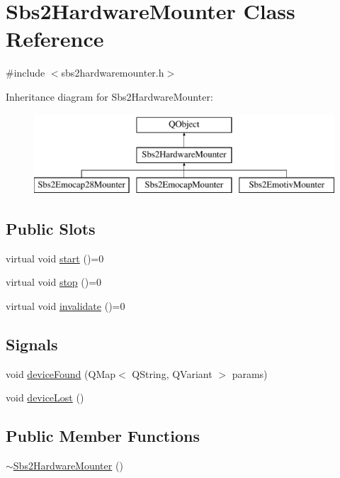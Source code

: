 \hypertarget{classSbs2HardwareMounter}{\section{Sbs2\-Hardware\-Mounter Class Reference}
\label{classSbs2HardwareMounter}
}


{\ttfamily \#include $<$sbs2hardwaremounter.\-h$>$}

Inheritance diagram for Sbs2\-Hardware\-Mounter\-:\begin{figure}[H]
\begin{center}
\leavevmode
\includegraphics[height=3.000000cm]{classSbs2HardwareMounter}
\end{center}
\end{figure}
\subsection*{Public Slots}
\begin{DoxyCompactItemize}
\item 
virtual void \hyperlink{classSbs2HardwareMounter_a5a37fde350e3db7bf70d7be368b876e9}{start} ()=0
\item 
virtual void \hyperlink{classSbs2HardwareMounter_a27bc12c9e5a1eeeed3669bc6afd780dd}{stop} ()=0
\item 
virtual void \hyperlink{classSbs2HardwareMounter_ae890d839cf616daf0ea80cc2e44ce2bd}{invalidate} ()=0
\end{DoxyCompactItemize}
\subsection*{Signals}
\begin{DoxyCompactItemize}
\item 
void \hyperlink{classSbs2HardwareMounter_a42bb432337e0cffc85baadf83a1813cd}{device\-Found} (Q\-Map$<$ Q\-String, Q\-Variant $>$ params)
\item 
void \hyperlink{classSbs2HardwareMounter_a715feed025039fbf3aaba0cb0621b453}{device\-Lost} ()
\end{DoxyCompactItemize}
\subsection*{Public Member Functions}
\begin{DoxyCompactItemize}
\item 
\hyperlink{classSbs2HardwareMounter_a791fa95ec691263fc0fdf1bddd21e92a}{$\sim$\-Sbs2\-Hardware\-Mounter} ()
\end{DoxyCompactItemize}

